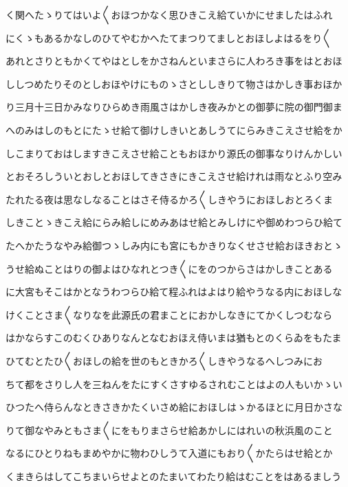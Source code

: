 \documentclass[a4paper,11pt,landscape]{ltjtarticle}
\begin{document}
\par\medskip
く関へたゝりてはいよ〱おほつかなく思ひきこえ給ていかにせましたはふれ
\par\medskip
にくゝもあるかなしのひてやむかへたてまつりてましとおほしよはるをり〱
\par\medskip
あれとさりともかくてやはとしをかさねんといまさらに人わろき事をはとおほ
\par\medskip
ししつめたりそのとしおほやけにものゝさとししきりて物さはかしき事おほか
\par\medskip
り三月十三日かみなりひらめき雨風さはかしき夜みかとの御夢に院の御門御ま
\par\medskip
へのみはしのもとにたゝせ給て御けしきいとあしうてにらみきこえさせ給をか
\par\medskip
しこまりておはしますきこえさせ給こともおほかり源氏の御事なりけんかしい
\par\medskip
とおそろしういとおしとおほしてきさきにきこえさせ給けれは雨なとふり空み
\par\medskip
たれたる夜は思なしなることはさそ侍るかろ〱しきやうにおほしおとろくま
\par\medskip
しきことゝきこえ給にらみ給しにめみあはせ給とみしけにや御めわつらひ給て
\par\medskip
たへかたうなやみ給御つゝしみ内にも宮にもかきりなくせさせ給おほきおとゝ
\par\medskip
うせ給ぬことはりの御よはひなれとつき〱にをのつからさはかしきことある
\par\medskip
に大宮もそこはかとなうわつらひ給て程ふれはよはり給やうなる内におほしな
\par\medskip
けくことさま〱なりなを此源氏の君まことにおかしなきにてかくしつむなら
\par\medskip
はかならすこのむくひありなんとなむおほえ侍いまは猶もとのくらゐをもたま
\par\medskip
ひてむとたひ〱おほしの給を世のもときかろ〱しきやうなるへしつみにお
\par\medskip
ちて都をさりし人を三ねんをたにすくさすゆるされむことはよの人もいかゝい
\par\medskip
ひつたへ侍らんなときさきかたくいさめ給におほしはゝかるほとに月日かさな
\par\medskip
りて御なやみともさま〱にをもりまさらせ給あかしにはれいの秋浜風のこと
\par\medskip
なるにひとりねもまめやかに物わひしうて入道にもおり〱かたらはせ給とか
\par\medskip
くまきらはしてこちまいらせよとのたまいてわたり給はむことをはあるましう
\par\medskip
\end{document}
